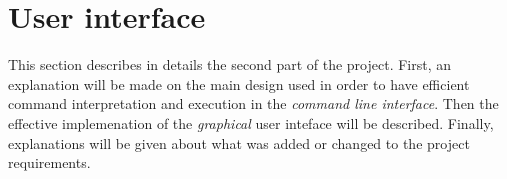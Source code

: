 \section{User interface} %
\label{sec:user_interface}
This section describes in details the second part of the project.
First, an explanation will be made on the main design used in order
to have efficient command interpretation and execution in 
the \emph{command line interface}.
Then the effective implemenation of the \emph{graphical} user inteface
will be described.
Finally, explanations will be given about what was added or changed
to the project requirements.


\newpage

\newpage

